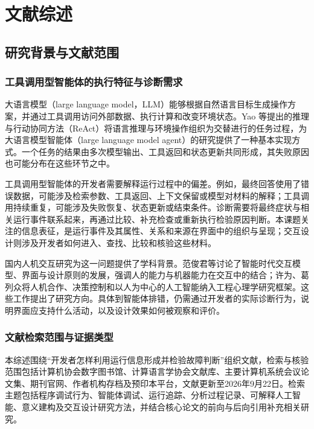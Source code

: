 \chapter{文献综述}\label{chap:literature-review}

\section{研究背景与文献范围}

\subsection{工具调用型智能体的执行特征与诊断需求}

大语言模型（large language model，LLM）能够根据自然语言目标生成操作方案，并通过工具调用访问外部数据、执行计算和改变环境状态。Yao 等\cite{yao2023react}提出的推理与行动协同方法（ReAct）将语言推理与环境操作组织为交替进行的任务过程，为大语言模型智能体（large language model agent）的研究提供了一种基本实现方式。一个任务的结果由多次模型输出、工具返回和状态更新共同形成，其失败原因也可能分布在这些环节之中。

工具调用型智能体的开发者需要解释运行过程中的偏差。例如，最终回答使用了错误数据，可能涉及检索参数、工具返回、上下文保留或模型对材料的解释；工具调用持续重复，可能涉及失败恢复、状态更新或结束条件。诊断需要将最终症状与相关运行事件联系起来，再通过比较、补充检查或重新执行检验原因判断。本课题关注的信息表征，是运行事件及其属性、关系和来源在界面中的组织与呈现；交互设计则涉及开发者如何进入、查找、比较和核验这些材料。

国内人机交互研究为这一问题提供了学科背景。范俊君等\cite{ref42}讨论了智能时代交互模型、界面与设计原则的发展，强调人的能力与机器能力在交互中的结合；许为、葛列众\cite{ref63}将人机合作、决策控制和以人为中心的人工智能纳入工程心理学研究框架。这些工作提出了研究方向。具体到智能体排错，仍需通过开发者的实际诊断行为，说明界面应支持什么活动，以及设计效果如何被观察和评价。

\subsection{文献检索范围与证据类型}

本综述围绕“开发者怎样利用运行信息形成并检验故障判断”组织文献，检索与核验范围包括计算机协会数字图书馆、计算语言学协会文献库、主要计算机系统会议论文集、期刊官网、作者机构存档及预印本平台，文献更新至2026年9月22日。检索主题包括程序调试行为、智能体调试、运行追踪、分析过程记录、可解释人工智能、意义建构及交互设计研究方法，并结合核心论文的前向与后向引用补充相关研究。

